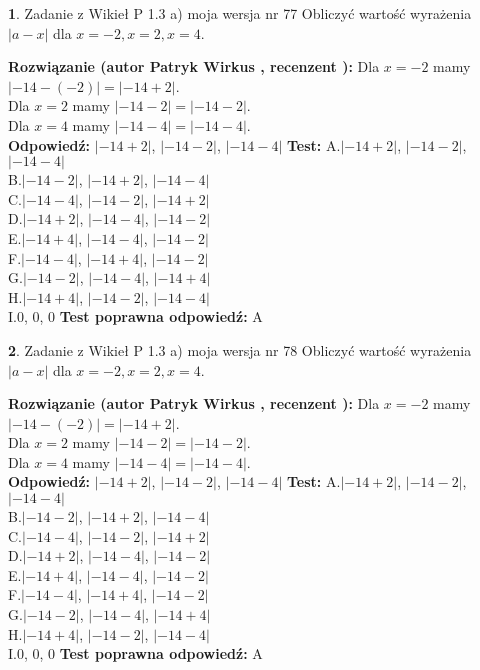 \documentclass[12pt, a4paper]{article}
\theoremstyle{definition} %
\newtheorem{zad}{}
\newcommand{\zadStart}[1]{\begin{zad}#1\newline}
\newcommand{\zadStop}{\end{zad}}
\newcommand{\rozwStart}[2]{\noindent \textbf{Rozwiązanie (autor #1 , recenzent #2): }\newline}
\newcommand{\rozwStop}{\newline}
\newcommand{\odpStart}{\noindent \textbf{Odpowiedź:}\newline}
\newcommand{\odpStop}{\newline}
\newcommand{\testStart}{\noindent \textbf{Test:}\newline}
\newcommand{\testStop}{\newline}
\newcommand{\kluczStart}{\noindent \textbf{Test poprawna odpowiedź:}\newline}
\newcommand{\kluczStop}{\newline}
\begin{document}
\zadStart{Zadanie z Wikieł P 1.3 a) moja wersja nr 77}
Obliczyć wartość wyrażenia $|a - x|$ dla $x=-2,x=2,x=4$.
\zadStop
\rozwStart{Patryk Wirkus}{}
Dla $x = -2$ mamy $|-14 - (-2)| = |-14 + 2|$.\\
Dla $x = 2$ mamy $|-14 - 2| = |-14 - 2|$.\\
Dla $x = 4$ mamy $|-14 - 4| = |-14 - 4|$.\\
\rozwStop
\odpStart
$|-14 + 2|$, $|-14 - 2|$, $|-14 - 4|$
\odpStop
\testStart
A.$|-14 + 2|$, $|-14 - 2|$, $|-14 - 4|$\\
B.$|-14 - 2|$, $|-14 + 2|$, $|-14 - 4|$\\
C.$|-14 - 4|$, $|-14 - 2|$, $|-14 + 2|$\\
D.$|-14 + 2|$, $|-14 - 4|$, $|-14 - 2|$\\
E.$|-14 + 4|$, $|-14 - 4|$, $|-14 - 2|$\\
F.$|-14 - 4|$, $|-14 + 4|$, $|-14 - 2|$\\
G.$|-14 - 2|$, $|-14 - 4|$, $|-14 + 4|$\\
H.$|-14 + 4|$, $|-14 - 2|$, $|-14 - 4|$\\
I.$0$, $0$, $0$
\testStop
\kluczStart
A
\kluczStop



\zadStart{Zadanie z Wikieł P 1.3 a) moja wersja nr 78}
Obliczyć wartość wyrażenia $|a - x|$ dla $x=-2,x=2,x=4$.
\zadStop
\rozwStart{Patryk Wirkus}{}
Dla $x = -2$ mamy $|-14 - (-2)| = |-14 + 2|$.\\
Dla $x = 2$ mamy $|-14 - 2| = |-14 - 2|$.\\
Dla $x = 4$ mamy $|-14 - 4| = |-14 - 4|$.\\
\rozwStop
\odpStart
$|-14 + 2|$, $|-14 - 2|$, $|-14 - 4|$
\odpStop
\testStart
A.$|-14 + 2|$, $|-14 - 2|$, $|-14 - 4|$\\
B.$|-14 - 2|$, $|-14 + 2|$, $|-14 - 4|$\\
C.$|-14 - 4|$, $|-14 - 2|$, $|-14 + 2|$\\
D.$|-14 + 2|$, $|-14 - 4|$, $|-14 - 2|$\\
E.$|-14 + 4|$, $|-14 - 4|$, $|-14 - 2|$\\
F.$|-14 - 4|$, $|-14 + 4|$, $|-14 - 2|$\\
G.$|-14 - 2|$, $|-14 - 4|$, $|-14 + 4|$\\
H.$|-14 + 4|$, $|-14 - 2|$, $|-14 - 4|$\\
I.$0$, $0$, $0$
\testStop
\kluczStart
A
\kluczStop
\end{document}
